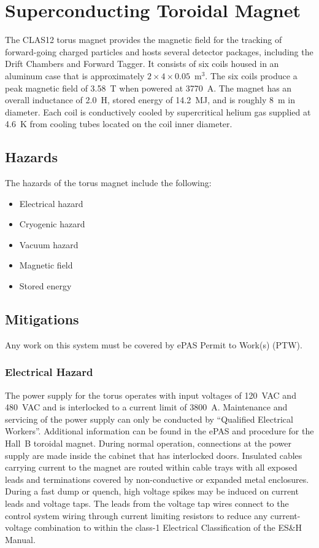 \section{Superconducting Toroidal Magnet}

The CLAS12 torus magnet provides the magnetic field for the tracking of forward-going
charged particles and hosts several detector packages, including the Drift Chambers 
and Forward Tagger. It consists of six coils housed in an aluminum case that is 
approximately $2 \times 4 \times 0.05$~m$^3$. The six coils produce a peak magnetic field 
of 3.58~T when powered at 3770~A. The magnet has an overall inductance of 2.0~H, stored 
energy of 14.2~MJ, and is roughly 8~m in diameter. Each coil is conductively cooled by 
supercritical helium gas supplied at 4.6~K from cooling tubes located on the coil inner 
diameter.

\subsection{Hazards} 

The hazards of the torus magnet include the following:

\begin{itemize}
\item Electrical hazard
\item Cryogenic hazard
\item Vacuum hazard
\item Magnetic field
\item Stored energy
\end{itemize}

\subsection{Mitigations}
Any work on this system must be covered by ePAS Permit to Work(s) (PTW).

\subsubsection{Electrical Hazard}

The power supply for the torus operates with input voltages of 120~VAC and 480~VAC and is 
interlocked to a current limit of 3800~A. Maintenance and servicing of the power supply can 
only be conducted by ``Qualified Electrical Workers''. Additional information can be found 
in the ePAS and procedure for the Hall~B toroidal magnet. During normal operation, connections at the
power supply are made inside the cabinet that has interlocked doors. Insulated cables 
carrying current to the magnet are routed within cable trays with all exposed leads and 
terminations covered by non-conductive or expanded metal enclosures. During a fast dump or 
quench, high voltage spikes may be induced on current leads and voltage taps. The leads from
the voltage tap wires connect to the control system wiring through current limiting resistors 
to reduce any current-voltage combination to within the class-1 Electrical Classification of 
the ES\&H Manual.

